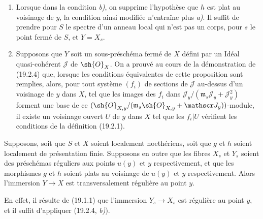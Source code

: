 \begin{remarks}[19.2.5]
\label{IV.19.2.5}
\begin{enumerate}
  \item[(i)] Lorsque dans la condition \emph{b)}, on supprime l'hypothèse que $h$ est plat au voisinage de $y$, la condition ainsi modifiée n'entraîne plus \emph{a)}. Il suffit de prendre pour $S$ le spectre d'un anneau local qui n'est pas un corps, pour $s$ le point fermé de $S$, et $Y=X_s$.
  \item[(ii)] Supposons que $Y$ soit un sous-préschéma fermé de $X$ défini par un Idéal quasi-cohérent $\mathscr J$ de $\sh{O}_X$. On a prouvé au cours de la démonstration de (19.2.4) que, lorsque les conditions équivalentes de cette proposition sont remplies, alors, pour tout système $(f_i)$ de sections de $\mathscr J$ au-dessus d'un voisinage de $y$ dans $X$, tel que les images des $f_i$ dans $\mathscr J_y/(\mathfrak m_s\mathscr J_y+\mathscr J_y^2)$ forment une base de ce $(\sh{O}_{X,y}/(\mathfrak m_s\sh{O}_{X,y}+\mathscr J_y))$-module, il existe un voisinage ouvert $U$ de $y$ dans $X$ tel que les $f_i|U$ vérifient les conditions de la définition (19.2.1).
\end{enumerate}
\end{remarks}


\begin{corollary}[19.2.6]
\label{IV.19.2.6}
Supposons, \textup{soit} que $S$ et $X$ soient localement noethériens, \textup{soit} que $g$ et $h$ soient localement de présentation finie. Supposons en outre que les fibres $X_s$ et $Y_s$ soient des préschémas réguliers aux points $u(y)$ et $y$ respectivement, et que les morphismes $g$ et $h$ soient plats au voisinage de $u(y)$ et $y$ respectivement. Alors l'immersion $Y\to X$ est transversalement régulière au point $y$.
\end{corollary}

En effet, il résulte de (19.1.1) que l'immersion $Y_s\to X_s$ est régulière au point $y$, et il suffit d'appliquer (19.2.4, \emph{b)}).

